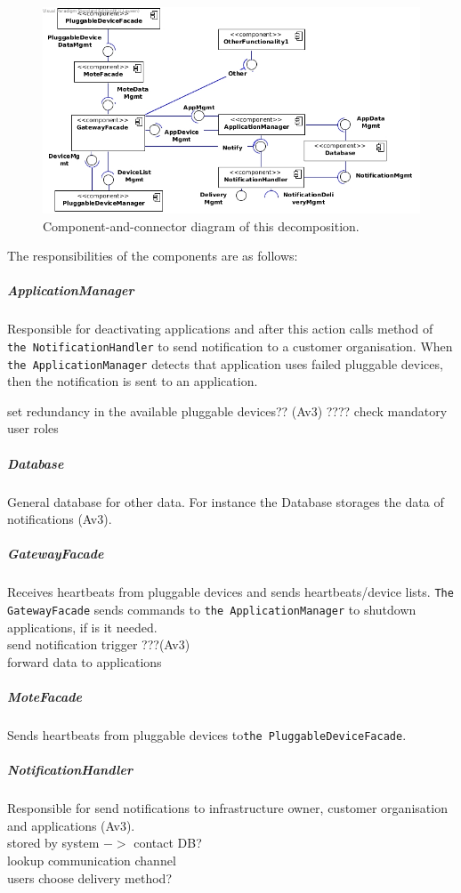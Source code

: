         \begin{figure}[!htp]
        	\centering
        	\includegraphics[width=1.00\textwidth]{component-diagram-1}
        	\caption{Component-and-connector diagram of this decomposition.}
            \label{fig:it1-cc_main}
        \end{figure}

        \noindent The responsibilities of the components are as follows:

    \subparagraph{ApplicationManager}
        Responsible for deactivating applications and after this action calls method of
        \texttt{the NotificationHandler} to send notification to a customer organisation.
        When \texttt{the ApplicationManager} detects that application uses failed pluggable devices,
        then the notification is sent to an application.

        set redundancy in the available pluggable devices??
        (Av3) ???? check mandatory user roles

    \subparagraph{Database}
        General database for other data. For instance the Database storages the data
        of notifications (Av3).

    \subparagraph{GatewayFacade}
        Receives heartbeats from pluggable devices and sends heartbeats/device lists.
        \texttt{The GatewayFacade} sends commands to \texttt{the ApplicationManager}
        to shutdown applications, if is it needed. \\

        send notification trigger ???(Av3)\\
        forward data to applications

    \subparagraph{MoteFacade}
        Sends heartbeats from pluggable devices to\texttt{the PluggableDeviceFacade}.

    \subparagraph{NotificationHandler}
        Responsible for send notifications to infrastructure owner, customer organisation
        and applications (Av3). \\
        stored by system \(->\) contact DB? \\
        lookup communication channel \\
        users choose delivery method?

